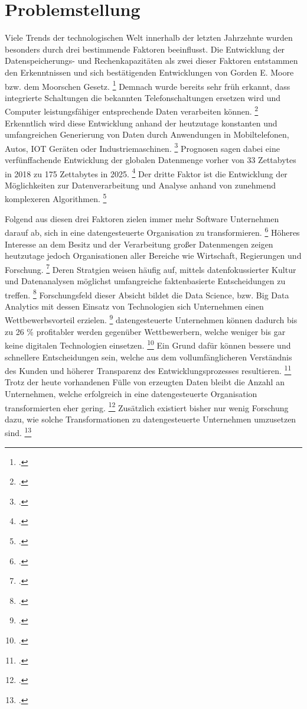 \chapter[Problemstellung]{Problemstellung}

Viele Trends der technologischen Welt innerhalb der letzten Jahrzehnte wurden besonders durch drei bestimmende Faktoren beeinflusst.
Die Entwicklung der Datenspeicherungs- und Rechenkapazitäten als zwei dieser Faktoren entstammen den Erkenntnissen und sich bestätigenden Entwicklungen von Gorden E. Moore bzw. dem Moorschen Gesetz. \footcite[Vgl.][S. 1]{Moore.1998}
Demnach wurde bereits sehr früh erkannt, dass integrierte Schaltungen die bekannten Telefonschaltungen ersetzen wird und Computer leistungsfähiger entsprechende Daten verarbeiten können. \footcite[Vgl.][S. 1]{Moore.1998}
Erkenntlich wird diese Entwicklung anhand der heutzutage konstanten und umfangreichen Generierung von Daten durch Anwendungen in Mobiltelefonen, Autos, IOT Geräten oder Industriemaschinen. \footcite[Vgl.][S 3f.]{Dalpiaz.2020}
Prognosen sagen dabei eine verfünffachende Entwicklung der globalen Datenmenge vorher von 33 Zettabytes in 2018 zu 175 Zettabytes in 2025. \footcite[Vgl.][S. 1]{Hupperz.2021}
Der dritte Faktor ist die Entwicklung der Möglichkeiten zur Datenverarbeitung und Analyse anhand von zunehmend komplexeren Algorithmen. \footcite[Vgl.][S. 4]{Dalpiaz.2020}

Folgend aus diesen drei Faktoren zielen immer mehr Software Unternehmen darauf ab, sich in eine datengesteuerte Organisation zu transformieren. \footcite[Vgl.][S. 1]{Fabijan.2017}
Höheres Interesse an dem Besitz und der Verarbeitung großer Datenmengen zeigen heutzutage jedoch Organisationen aller Bereiche wie Wirtschaft, Regierungen und Forschung. \footcite[Vgl.][S. 1]{Pratt.2023}
Deren Stratgien weisen häufig auf, mittels datenfokussierter Kultur und Datenanalysen möglichst umfangreiche faktenbasierte Entscheidungen zu treffen. \footcite[Vgl.][S. 18]{Dalpiaz.2020}
Forschungsfeld dieser Absicht bildet die Data Science, bzw. Big Data Analytics mit dessen Einsatz von Technologien sich Unternehmen einen Wettbewerbsvorteil erzielen. \footcite[Vgl.][S. 3]{Dalpiaz.2020}
datengesteuerte Unternehmen können dadurch bis zu 26 \% profitabler werden gegenüber Wettbewerbern, welche weniger bis gar keine digitalen Technologien einsetzen. \footcite[Vgl.][S. 1]{Fabijan.2017}
Ein Grund dafür können bessere und schnellere Entscheidungen sein, welche aus dem vollumfänglicheren Verständnis des Kunden und höherer Transparenz des Entwicklungsprozesses resultieren. \footcite[Vgl.][S. 18]{Dalpiaz.2020}
Trotz der heute vorhandenen Fülle von erzeugten Daten bleibt die Anzahl an Unternehmen, welche erfolgreich in eine datengesteuerte Organisation transformierten eher gering. \footcite[Vgl.][S. 1]{Fabijan.2017}
Zusätzlich existiert bisher nur wenig Forschung dazu, wie solche Transformationen zu datengesteuerte Unternehmen umzusetzen sind. \footcite[Vgl.][S. 1]{Fabijan.2017}

